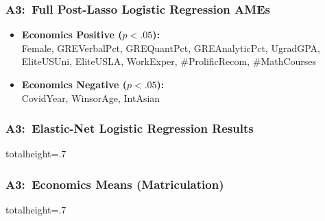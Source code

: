 \documentclass[12pt, aspectratio=169]{beamer}
\begin{document}
\begin{frame}[label=fpllra]
\frametitle{A3:\ Full Post-Lasso Logistic Regression AMEs}
\addtocounter{framenumber}{-1}
\centering
\addtocounter{table}{-1}
\renewcommand{\thetable}{\arabic{table}b}
\vspace{-7.5pt}
\begin{minipage}[t]{0.3\textwidth}
\end{minipage}%
\hfill
\begin{minipage}[c][0.8\textheight][c]{0.7\textwidth}
\begin{itemize}
\item \textbf{Economics Positive ($p<.05$):}\ \\ Female, GREVerbalPct, GREQuantPct, GREAnalyticPct, UgradGPA, EliteUSUni, EliteUSLA, WorkExper, \#ProlificRecom, \#MathCourses
\vspace{10pt}
\item \textbf{Economics Negative ($p<.05$):}\ \\ CovidYear, WinsorAge, IntAsian
\end{itemize}
\end{minipage}
\raggedright
\hyperlink{pllra}{}
\end{frame}

\begin{frame}[label=enlrr]
\frametitle{A3:\ Elastic-Net Logistic Regression Results}
\begin{table}[htbp]
\begin{center}
\caption{Elastic-Net Logistic Regression Results}
\vspace{5pt}
\begin{adjustbox}{totalheight=.7\textheight}
\resizebox*{!}{\dimexpr\textheight-3.5\baselineskip\relax}{
}
\end{adjustbox}
\end{center}
\end{table}
\hyperlink{pllra}{}
\end{frame}

\begin{frame}[label=emm]
\frametitle{A3:\ Economics Means (Matriculation)}
\begin{table}[htbp]
\begin{center}
\vspace{5pt}
\begin{adjustbox}{totalheight=.7\textheight}
\resizebox*{!}{\dimexpr\textheight-3.5\baselineskip\relax}{
}
\end{adjustbox}
\end{center}
\end{table}
\hyperlink{rfs}{}
\end{frame}
\end{document}
